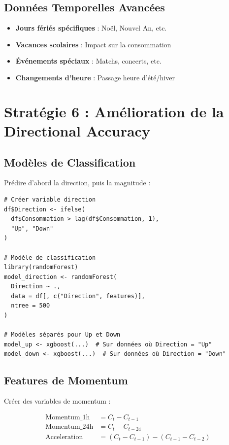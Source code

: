 \documentclass[12pt,a4paper]{article}
\begin{document}
\subsection{Données Temporelles Avancées}

\begin{itemize}
    \item \textbf{Jours fériés spécifiques} : Noël, Nouvel An, etc.
    \item \textbf{Vacances scolaires} : Impact sur la consommation
    \item \textbf{Événements spéciaux} : Matchs, concerts, etc.
    \item \textbf{Changements d'heure} : Passage heure d'été/hiver
\end{itemize}

\section{Stratégie 6 : Amélioration de la Directional Accuracy}

\subsection{Modèles de Classification}

Prédire d'abord la direction, puis la magnitude :

\begin{verbatim}
# Créer variable direction
df$Direction <- ifelse(
  df$Consommation > lag(df$Consommation, 1),
  "Up", "Down"
)

# Modèle de classification
library(randomForest)
model_direction <- randomForest(
  Direction ~ .,
  data = df[, c("Direction", features)],
  ntree = 500
)

# Modèles séparés pour Up et Down
model_up <- xgboost(...)  # Sur données où Direction = "Up"
model_down <- xgboost(...)  # Sur données où Direction = "Down"
\end{verbatim}

\subsection{Features de Momentum}

Créer des variables de momentum :

\begin{align}
    \text{Momentum\_1h} &= C_t - C_{t-1} \\
    \text{Momentum\_24h} &= C_t - C_{t-24} \\
    \text{Acceleration} &= (C_t - C_{t-1}) - (C_{t-1} - C_{t-2})
\end{align}
\end{document}
